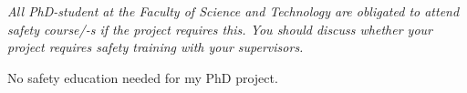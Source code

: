 %
%
\textit{All PhD-student at the Faculty of Science and Technology are obligated to attend safety course/-s if the project requires this. You should discuss whether your project requires safety training with your supervisors.}
\vspace{1cm}

No safety education needed for my PhD project. 